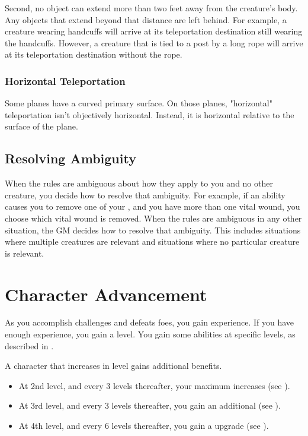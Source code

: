             Second, no object can extend more than two feet away from the creature's body.
            Any objects that extend beyond that distance are left behind.
            For example, a creature wearing handcuffs will arrive at its teleportation destination still wearing the handcuffs.
            However, a creature that is tied to a post by a long rope will arrive at its teleportation destination without the rope.

        \subsubsection{Horizontal Teleportation}
            Some planes have a curved primary surface.
            On those planes, "horizontal" teleportation isn't objectively horizontal.
            Instead, it is horizontal relative to the surface of the plane.

    \subsection{Resolving Ambiguity}\label{Resolving Ambiguity}
        When the rules are ambiguous about how they apply to you and no other creature, you decide how to resolve that ambiguity.
        For example, if an ability causes you to remove one of your , and you have more than one vital wound, you choose which vital wound is removed.
        When the rules are ambiguous in any other situation, the GM decides how to resolve that ambiguity.
        This includes situations where multiple creatures are relevant and situations where no particular creature is relevant.

\section{Character Advancement}\label{Character Advancement}

    As you accomplish challenges and defeats foes, you gain experience.
    If you have enough experience, you gain a level.
    You gain some abilities at specific levels, as described in .

    A character that increases in level gains additional benefits.
    \begin{itemize}
        \item At 2nd level, and every 3 levels thereafter, your maximum  increases (see ).
        \item At 3rd level, and every 3 levels thereafter, you gain an additional  (see ).
        \item At 4th level, and every 6 levels thereafter, you gain a  upgrade (see ).
    \end{itemize}


